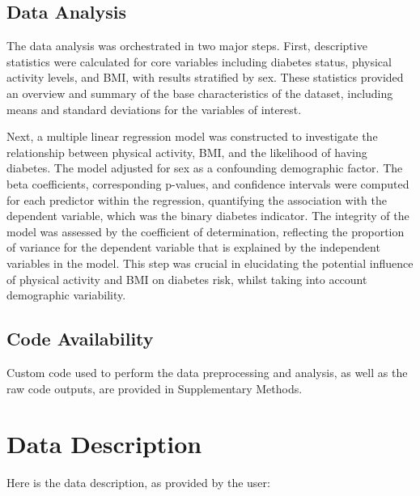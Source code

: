 \documentclass[11pt]{article}
\begin{document}
\subsection*{Data Analysis}
The data analysis was orchestrated in two major steps. First, descriptive statistics were calculated for core variables including diabetes status, physical activity levels, and BMI, with results stratified by sex. These statistics provided an overview and summary of the base characteristics of the dataset, including means and standard deviations for the variables of interest.

Next, a multiple linear regression model was constructed to investigate the relationship between physical activity, BMI, and the likelihood of having diabetes. The model adjusted for sex as a confounding demographic factor. The beta coefficients, corresponding p-values, and confidence intervals were computed for each predictor within the regression, quantifying the association with the dependent variable, which was the binary diabetes indicator. The integrity of the model was assessed by the coefficient of determination, reflecting the proportion of variance for the dependent variable that is explained by the independent variables in the model. This step was crucial in elucidating the potential influence of physical activity and BMI on diabetes risk, whilst taking into account demographic variability.\subsection*{Code Availability}

Custom code used to perform the data preprocessing and analysis, as well as the raw code outputs, are provided in Supplementary Methods.






\clearpage
\appendix

\section{Data Description} \label{sec:data_description} Here is the data description, as provided by the user:
\end{document}
